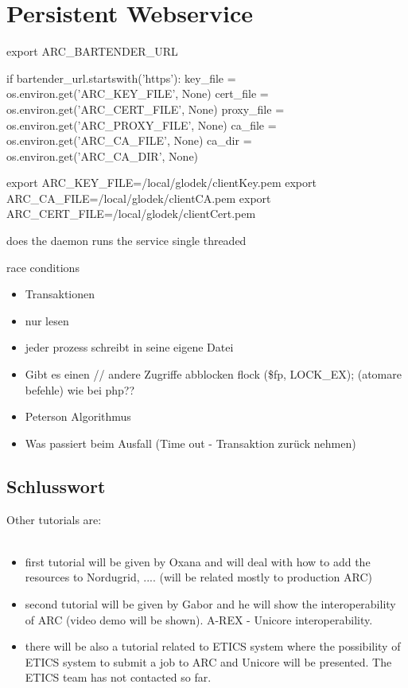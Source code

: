  
\chapter{Persistent Webservice}


export ARC\_BARTENDER\_URL

if bartender_url.startswith('https'):
    key_file = os.environ.get('ARC_KEY_FILE', None)
    cert_file = os.environ.get('ARC_CERT_FILE', None)
    proxy_file = os.environ.get('ARC_PROXY_FILE', None)
    ca_file = os.environ.get('ARC_CA_FILE', None)
    ca_dir = os.environ.get('ARC_CA_DIR', None)

export ARC_KEY_FILE=/local/glodek/clientKey.pem
export ARC_CA_FILE=/local/glodek/clientCA.pem
export ARC_CERT_FILE=/local/glodek/clientCert.pem

does the daemon runs the service single threaded

race conditions
\begin{itemize}
 \item Transaktionen
 \item nur lesen
 \item jeder prozess schreibt in seine eigene Datei
 \item Gibt es einen     // andere Zugriffe abblocken
    flock (\$fp, LOCK\_EX);  (atomare befehle)
 	wie bei php??
 \item Peterson Algorithmus
 \item Was passiert beim Ausfall (Time out - Transaktion zurück nehmen)
\end{itemize}



\section{Schlusswort}

Other tutorials are:\\
\\
\begin{itemize}
 \item first tutorial will be given by Oxana and will deal with how to add the 
resources to Nordugrid, .... (will be related mostly to production ARC)
 \item second tutorial will be given by Gabor and he will show the 
interoperability of ARC (video demo will be shown). A-REX - Unicore 
interoperability.
 \item there will be also a tutorial related to ETICS system where the 
possibility of ETICS system to submit a job to ARC and Unicore will be 
presented. The ETICS team has not contacted so far.
\end{itemize}





